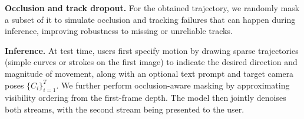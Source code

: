 \noindent\textbf{Occlusion and track dropout.}\quad
For the obtained trajectory, we
randomly mask a subset of it to simulate occlusion and tracking failures that can happen during inference,
improving robustness to missing or unreliable tracks.

\noindent\textbf{Inference.}\quad
At test time, users first specify motion by drawing sparse trajectories (simple curves or strokes on the first image) to indicate the desired
direction and magnitude of movement, along with an optional text prompt and target camera poses $\{C_i\}_{i=1}^{T}$.
We further perform occlusion-aware masking by approximating visibility ordering from the first-frame depth.
The model then jointly denoises both streams, with the second stream being presented to the user.
